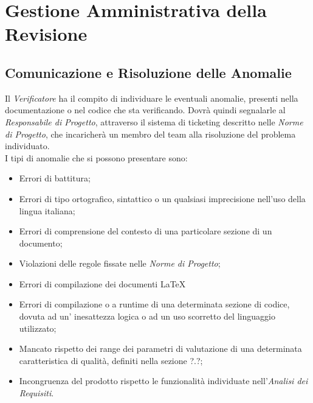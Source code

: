 \newpage
\section{Gestione Amministrativa della Revisione}

\subsection{Comunicazione e Risoluzione delle Anomalie}
Il \textit{Verificatore} ha il compito di individuare le eventuali anomalie, presenti nella documentazione o nel codice che sta verificando. Dovrà quindi segnalarle al \textit{Responsabile di Progetto}, attraverso il sistema di ticketing descritto nelle \textit{Norme di Progetto}, che incaricherà un membro del team alla risoluzione del problema individuato.\\ I tipi di anomalie che si possono presentare sono:
\begin{itemize} 
\item Errori di battitura;
\item Errori di tipo ortografico, sintattico o un qualsiasi imprecisione nell'uso della lingua italiana; 
\item Errori di comprensione del contesto di una particolare sezione di un documento;
\item Violazioni delle regole fissate nelle \textit{Norme di Progetto};
\item Errori di compilazione dei documenti \LaTeX~
\item Errori di compilazione o a runtime di una determinata sezione di codice, dovuta ad un' inesattezza logica o ad un uso scorretto del linguaggio utilizzato; 
\item Mancato rispetto dei range dei parametri di valutazione di una determinata caratteristica di qualità, definiti nella sezione ?.?;
\item Incongruenza del prodotto rispetto le funzionalità individuate nell’\textit{Analisi dei Requisiti}.
\end{itemize}
